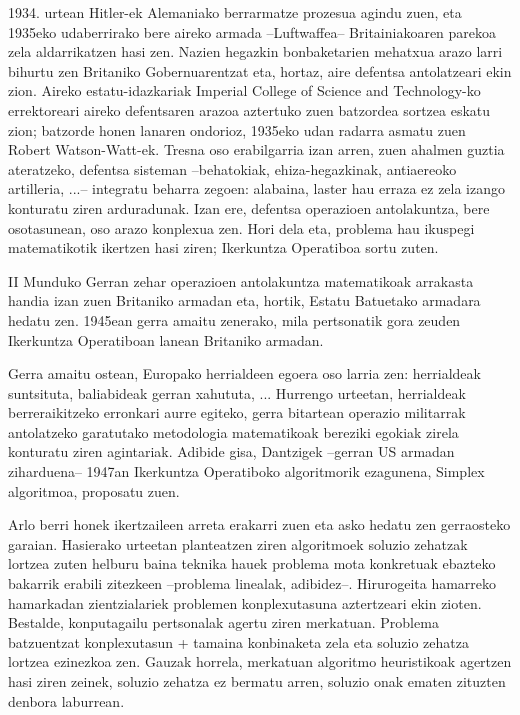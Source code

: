 \documentclass[eu]{ifirak}\usepackage[]{graphicx}\usepackage[]{color}
\newcommand{\zkk}{\guillemotleft}
\newcommand{\skk}{\guillemotright}
\begin{document}
1934. urtean Hitler-ek Alemaniako berrarmatze prozesua agindu zuen, eta 1935eko udaberrirako bere aireko armada --Luftwaffea-- Britainiakoaren parekoa zela aldarrikatzen hasi zen. Nazien hegazkin bonbaketarien mehatxua arazo larri bihurtu zen Britaniko Gobernuarentzat eta, hortaz, aire defentsa antolatzeari ekin zion. Aireko estatu-idazkariak \zkk Imperial College of Science and Technology\skk -ko errektoreari aireko defentsaren arazoa aztertuko zuen batzordea sortzea eskatu zion; batzorde honen lanaren ondorioz, 1935eko udan radarra asmatu zuen Robert Watson-Watt-ek. Tresna oso erabilgarria izan arren, zuen ahalmen guztia ateratzeko, defentsa sisteman --behatokiak, ehiza-hegazkinak, antiaereoko artilleria, ...--  integratu beharra zegoen: alabaina, laster hau erraza ez zela izango konturatu ziren arduradunak. Izan ere, defentsa operazioen antolakuntza, bere osotasunean, oso arazo konplexua zen. Hori dela eta, problema hau ikuspegi matematikotik ikertzen hasi ziren; Ikerkuntza Operatiboa sortu zuten.

II Munduko Gerran zehar operazioen antolakuntza \zkk matematikoa\skk k arrakasta handia izan zuen Britaniko armadan eta, hortik, Estatu Batuetako armadara hedatu zen. 1945ean gerra amaitu zenerako, mila pertsonatik gora zeuden Ikerkuntza Operatiboan lanean Britaniko armadan.

Gerra amaitu ostean, Europako herrialdeen egoera oso larria zen: herrialdeak suntsituta, baliabideak gerran xahututa, ... Hurrengo urteetan, herrialdeak berreraikitzeko erronkari aurre egiteko, gerra bitartean operazio militarrak antolatzeko garatutako metodologia matematikoak bereziki egokiak zirela konturatu ziren agintariak. Adibide gisa, Dantzigek --gerran US armadan ziharduena-- 1947an Ikerkuntza Operatiboko algoritmorik ezagunena, Simplex algoritmoa, proposatu zuen. 

Arlo berri honek ikertzaileen arreta erakarri zuen eta asko hedatu zen gerraosteko garaian. Hasierako urteetan planteatzen ziren algoritmoek soluzio zehatzak lortzea zuten helburu baina teknika hauek problema mota konkretuak ebazteko bakarrik erabili zitezkeen --problema linealak, adibidez--. Hirurogeita hamarreko hamarkadan zientzialariek problemen konplexutasuna aztertzeari ekin zioten. Bestalde, konputagailu pertsonalak agertu ziren merkatuan. Problema batzuentzat konplexutasun + tamaina konbinaketa zela eta soluzio zehatza lortzea ezinezkoa zen. Gauzak horrela, merkatuan algoritmo heuristikoak agertzen hasi ziren zeinek, soluzio zehatza ez bermatu arren, soluzio onak ematen zituzten denbora laburrean.
\end{document}
